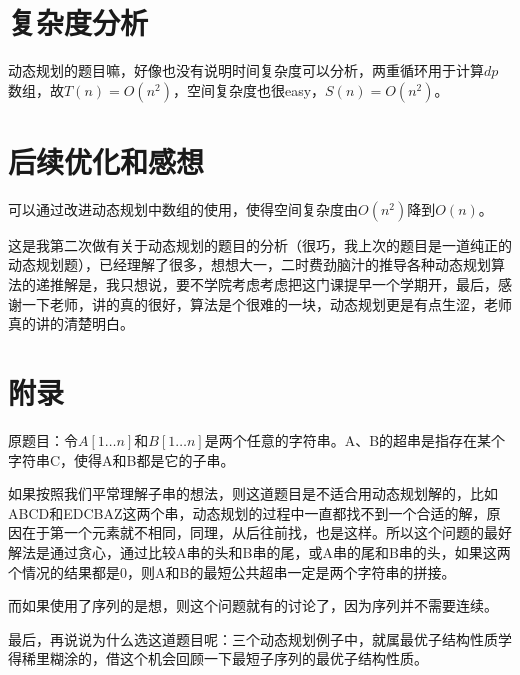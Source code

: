 \documentclass[11pt]{ctexart}
\begin{document}
\section{复杂度分析}
动态规划的题目嘛，好像也没有说明时间复杂度可以分析，两重循环用于计算$dp$数组，故$T(n) = O(n^{2})$，空间复杂度也很easy，$S(n) = O(n^{2})$。

\section{后续优化和感想}
可以通过改进动态规划中数组的使用，使得空间复杂度由$O(n^{2})$降到$O(n)$。

这是我第二次做有关于动态规划的题目的分析（很巧，我上次的题目是一道纯正的动态规划题），已经理解了很多，想想大一，二时费劲脑汁的推导各种动态规划算法的递推解是，我只想说，要不学院考虑考虑把这门课提早一个学期开，最后，感谢一下老师，讲的真的很好，算法是个很难的一块，动态规划更是有点生涩，老师真的讲的清楚明白。

\section{附录}
原题目：令$A[1\dots n]$和$B[1\dots n]$是两个任意的字符串。A、B的超串是指存在某个字符串C，使得A和B都是它的子串。

如果按照我们平常理解子串的想法，则这道题目是不适合用动态规划解的，比如ABCD和EDCBAZ这两个串，动态规划的过程中一直都找不到一个合适的解，原因在于第一个元素就不相同，同理，从后往前找，也是这样。所以这个问题的最好解法是通过贪心，通过比较A串的头和B串的尾，或A串的尾和B串的头，如果这两个情况的结果都是0，则A和B的最短公共超串一定是两个字符串的拼接。

而如果使用了序列的是想，则这个问题就有的讨论了，因为序列并不需要连续。

最后，再说说为什么选这道题目呢：三个动态规划例子中，就属最优子结构性质学得稀里糊涂的，借这个机会回顾一下最短子序列的最优子结构性质。
\end{document}
